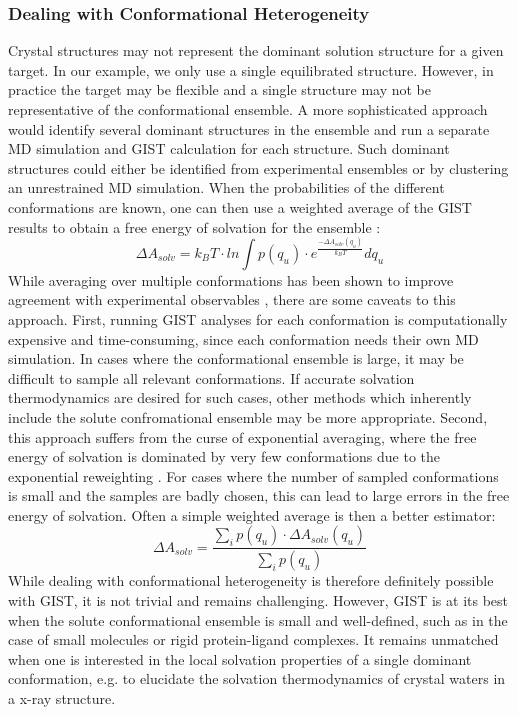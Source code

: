 \documentclass[9pt,tutorial]{livecoms}
\begin{document}
\subsubsection{Dealing with Conformational Heterogeneity}
Crystal structures may not represent the dominant solution structure for a given target.
In our example, we only use a single equilibrated structure.
However, in practice the target may be flexible and a single structure may not be representative of the conformational ensemble.
A more sophisticated approach would identify several dominant structures in the ensemble and run a separate MD simulation and GIST calculation for each structure. 
Such dominant structures could either be identified from experimental ensembles or by clustering an unrestrained MD simulation. 
When the probabilities of the different conformations are known, one can then use a weighted average of the GIST results to obtain a free energy of solvation for the ensemble \cite{Waibl2021-gist-antibodies}:
\begin{equation}
	\Delta A_{solv} = k_BT \cdot ln \int p(q_u) \cdot e^{ \frac{-\Delta A_{solv}(q_u)}{k_BT}} dq_u
\end{equation}
While averaging over multiple conformations has been shown to improve agreement with experimental observables \cite{Kamenik2020-gist-macrocycles,Waibl2021-gist-antibodies}, there are some caveats to this approach. 
First, running GIST analyses for each conformation is computationally expensive and time-consuming, since each conformation needs their own MD simulation.
In cases where the conformational ensemble is large, it may be difficult to sample all relevant conformations. 
If accurate solvation thermodynamics are desired for such cases, other methods which inherently include the solute confromational ensemble may be more appropriate.
Second, this approach suffers from the curse of exponential averaging, where the free energy of solvation is dominated by very few conformations due to the exponential reweighting \cite{Ekberg2021-exponential}.
For cases where the number of sampled conformations is small and the samples are badly chosen, this can lead to large errors in the free energy of solvation.
Often a simple weighted average is then a better estimator:
\begin{equation}
	\Delta A_{solv} = \frac{\sum_i p(q_u) \cdot \Delta A_{solv}(q_u)}{\sum_i p(q_u)}
\end{equation}
While dealing with conformational heterogeneity is therefore definitely possible with GIST, it is not trivial and remains challenging.
However, GIST is at its best when the solute conformational ensemble is small and well-defined, such as in the case of small molecules or rigid protein-ligand complexes.
It remains unmatched when one is interested in the local solvation properties of a single dominant conformation, e.g. to elucidate the solvation thermodynamics of crystal waters in a x-ray structure.
\end{document}
